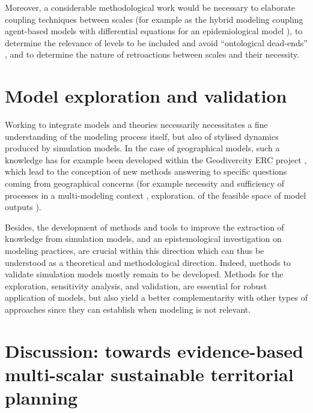 Moreover, a considerable methodological work would be necessary to elaborate coupling techniques between scales (for example as the hybrid modeling coupling agent-based models with differential equations for an epidemiological model \cite{banos2015coupling}), to determine the relevance of levels to be included and avoid ``ontological dead-ends'' \cite{roth2006reconstruction}, and to determine the nature of retroactions between scales and their necessity.




\section{Model exploration and validation}


Working to integrate models and theories necessarily necessitates a fine understanding of the modeling process itself, but also of stylised dynamics produced by simulation models. In the case of geographical models, such a knowledge has for example been developed within the Geodivercity ERC project \cite{pumain2017urban}, which lead to the conception of new methods answering to specific questions coming from geographical concerns (for example necessity and sufficiency of processes in a multi-modeling context \cite{reuillon2015}, exploration. of the feasible space of model outputs \cite{10.1371/journal.pone.0138212}).

Besides, the development of methods and tools to improve the extraction of knowledge from simulation models, and an epistemological investigation on modeling practices, are crucial within this direction which can thus be understood as a theoretical and methodological direction. Indeed, methods to validate simulation models mostly remain to be developed. Methods for the exploration, sensitivity analysis, and validation, are essential for robust application of models, but also yield a better complementarity with other types of approaches since they can establish when modeling is not relevant.



\section{Discussion: towards evidence-based multi-scalar sustainable territorial planning}





